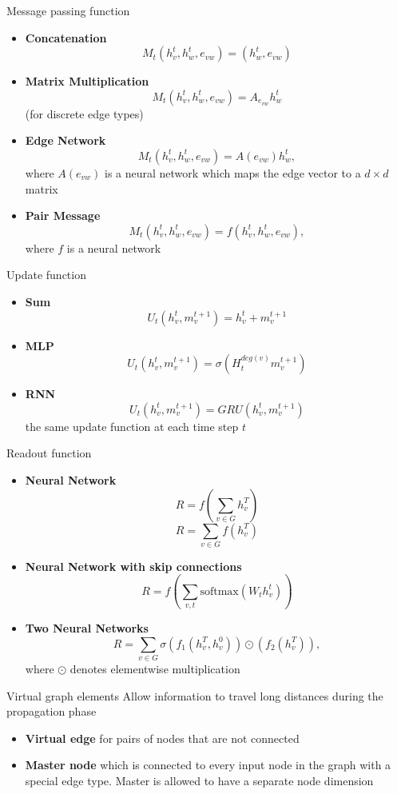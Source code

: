 \documentclass[13pt]{beamer}				\usepackage{graphicx}
\begin{document}
\begin{frame}{Message passing function}
\begin{itemize}
\item \textbf{Concatenation}
$$M_t(h_v^t, h_w^t, e_{vw}) = (h_w^t, e_{vw})$$
\item \textbf{Matrix Multiplication}
$$M_t(h_v^t, h_w^t, e_{vw}) = A_{e_{vw}}h_w^t$$ (for discrete edge types)
\item \textbf{Edge Network}
$$M_t(h_v^t, h_w^t, e_{vw}) = A(e_{vw}) h_w^t,$$ where $A(e_{vw})$ is a neural network which maps the edge vector to a $d\times d$ matrix
\item \textbf{Pair Message}
$$M_t(h_v^t, h_w^t, e_{vw}) = f(h_v^t, h_w^t, e_{vw}),$$ where $f$ is a neural network
\end{itemize}
\end{frame}

\begin{frame}{Update function}
\begin{itemize}
\item \textbf{Sum} 
$$U_t(h_v^t, m_v^{t+1}) = h_v^t + m_v^{t+1}$$
\item \textbf{MLP}
$$U_t(h_v^t, m_v^{t+1}) = \sigma(H_t^{deg(v)} m_v^{t+1})$$
\item \textbf{RNN} 
$$U_t(h_v^t, m_v^{t+1}) = GRU(h_v^t, m_v^{t+1})$$
the same update function at each time step $t$
\end{itemize}
\end{frame}

\begin{frame}{Readout function}
\begin{itemize}
\item \textbf{Neural Network}
$$R = f(\sum \limits_{v \in G} h_v^T)$$
$$R = \sum \limits_{v \in G} f(h_v^T)$$
\item \textbf{Neural Network with skip connections}
$$R = f\left(\sum \limits_{v, t} \text{softmax}(W_t h_v^t)\right)$$
\item \textbf{Two Neural Networks}
$$R = \sum \limits_{v \in G} \sigma \left(f_1(h_v^T, h_v^0)\right) \odot \left(f_2(h_v^T)\right),$$
where $\odot$ denotes elementwise multiplication
\end{itemize}
\end{frame}

\begin{frame}{Virtual graph elements}
Allow information to travel long distances during the propagation phase
\begin{itemize}
\item \textbf{Virtual edge} for pairs of nodes that are not connected
\item \textbf{Master node} which is connected to every input node in the graph with a special edge type. Master is allowed to have a separate node dimension
\end{itemize}
\end{frame}
\end{document}
